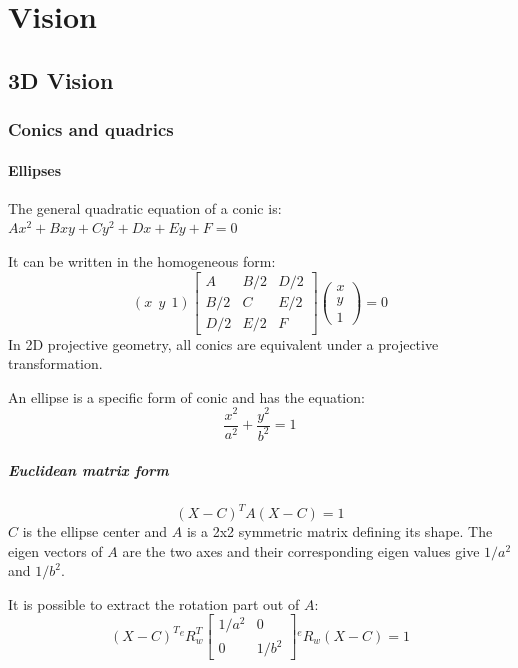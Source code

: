 \part{Vision}


\chapter{3D Vision}

\section{Conics and quadrics}

\subsection{Ellipses}
The general quadratic equation of a conic is: $Ax^2 + Bxy + Cy^2 + Dx + Ey + F = 0 $

It can be written in the homogeneous form:
\begin{equation}
(x~~y~~1) \left[\begin{array}{ccc}
     A & B/2 & D/2  \\
     B/2 & C & E/2 \\
     D/2 & E/2 & F
\end{array}\right] 
\left( \begin{array}{c}
     x  \\
     y \\
     1
\end{array} \right)
= 0
\end{equation}
In 2D projective geometry, all conics are equivalent under a projective transformation.

An ellipse is a specific form of conic and has the equation:
\begin{equation}
\frac{x^2}{a^2} + \frac{y^2}{b^2} = 1
\end{equation}

\subsubsection{Euclidean matrix form}
\begin{equation}
    (X - C)^T A (X - C) = 1
\end{equation}
$C$ is the ellipse center and $A$ is a 2x2 symmetric matrix defining its shape. The eigen vectors of $A$ are the two axes and their corresponding eigen values give $1/a^2$ and $1/b^2$.

It is possible to extract the rotation part out of $A$:
\begin{equation}
(X - C)^T {}^{e}R_{w}^T \left[ \begin{array}{cc}
    1/a^2 & 0 \\
    0 & 1/b^2
\end{array}
\right] {}^{e}R_{w} (X - C) = 1
\end{equation}


